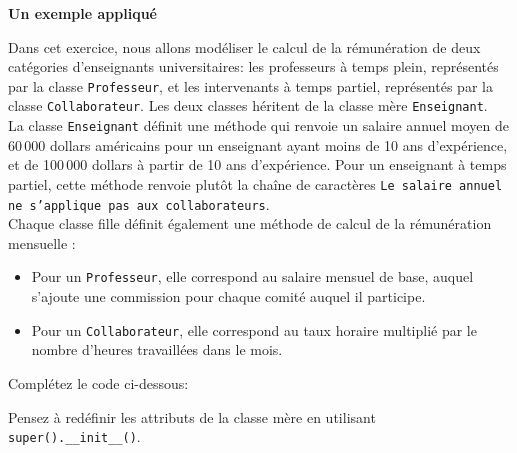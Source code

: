 \begin{Exercice}[30 minutes]\textbf{Un exemple appliqué}
    
    Dans cet exercice, nous allons modéliser le calcul de la rémunération de deux catégories d'enseignants universitaires: les professeurs à temps plein, représentés par la classe \lstinline{Professeur}, et les intervenants à temps partiel, représentés par la classe \lstinline{Collaborateur}. Les deux classes héritent de la classe mère \lstinline{Enseignant}. \\

    La classe \lstinline{Enseignant} définit une méthode qui renvoie un salaire annuel moyen de 60\,000 dollars américains pour un enseignant ayant moins de 10 ans d'expérience, et de 100\,000 dollars à partir de 10 ans d'expérience. Pour un enseignant à temps partiel, cette méthode renvoie plutôt la chaîne de caractères \texttt{Le salaire annuel ne s'applique pas aux collaborateurs}. \\

    Chaque classe fille définit également une méthode de calcul de la rémunération mensuelle :
    \begin{itemize}
        \item Pour un \lstinline{Professeur}, elle correspond au salaire mensuel de base, auquel s'ajoute une commission pour chaque comité auquel il participe.
        \item Pour un \lstinline{Collaborateur}, elle correspond au taux horaire multiplié par le nombre d'heures travaillées dans le mois.
    \end{itemize}
    
    
    Complétez le code ci-dessous:
    
    
    
    \begin{conseil}
    Pensez à redéfinir les attributs de la classe mère en utilisant \lstinline{super().__init__()}.
    \end{conseil}
    
    \begin{solution}
    
    \end{solution}
    \end{Exercice}

